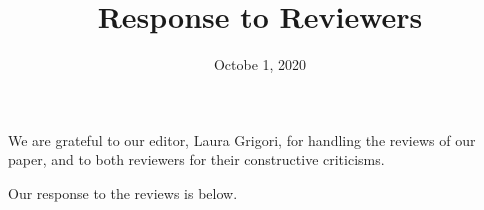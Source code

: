 \documentclass[final,onefignum,onetabnum]{siamart190516}
\begin{document}
\title{Response to Reviewers}
\date{Octobe 1, 2020}
\maketitle
We are grateful to our editor, Laura Grigori, for handling the reviews of our paper, and to both reviewers for their constructive criticisms.

Our response to the reviews is below.\\

\end{document}
